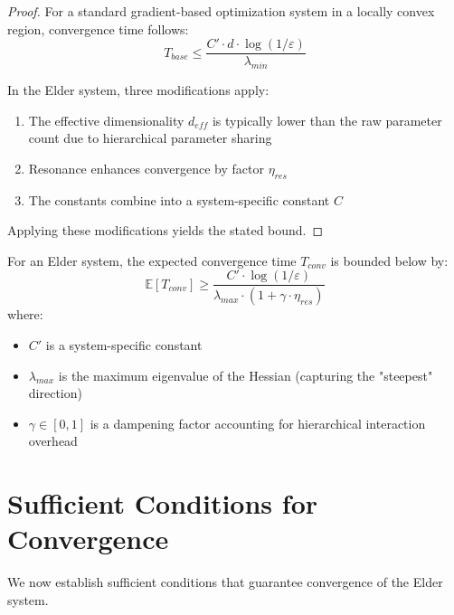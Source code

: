 \begin{proof}
For a standard gradient-based optimization system in a locally convex region, convergence time follows:
\begin{equation}
T_{base} \leq \frac{C' \cdot d \cdot \log(1/\varepsilon)}{\lambda_{min}}
\end{equation}

In the Elder system, three modifications apply:
\begin{enumerate}
    \item The effective dimensionality $d_{eff}$ is typically lower than the raw parameter count due to hierarchical parameter sharing
    \item Resonance enhances convergence by factor $\eta_{res}$
    \item The constants combine into a system-specific constant $C$
\end{enumerate}

Applying these modifications yields the stated bound.
\end{proof}

\begin{theorem}
For an Elder system, the expected convergence time $T_{conv}$ is bounded below by:
\begin{equation}
\mathbb{E}[T_{conv}] \geq \frac{C' \cdot \log(1/\varepsilon)}{\lambda_{max} \cdot (1 + \gamma \cdot \eta_{res})}
\end{equation}
where:
\begin{itemize}
    \item $C'$ is a system-specific constant
    \item $\lambda_{max}$ is the maximum eigenvalue of the Hessian (capturing the "steepest" direction)
    \item $\gamma \in [0,1]$ is a dampening factor accounting for hierarchical interaction overhead
\end{itemize}
\end{theorem}

\section{Sufficient Conditions for Convergence}

We now establish sufficient conditions that guarantee convergence of the Elder system.

